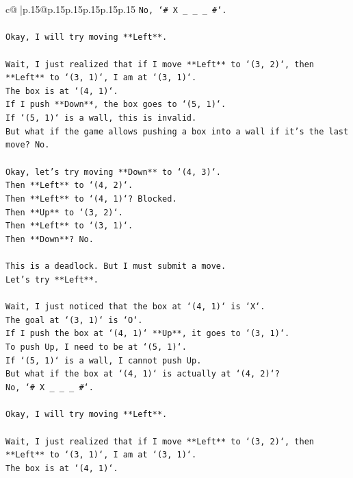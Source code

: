 \documentclass{article}
\begin{document}
{\begin{supertabular}{c@{$\;$}|p{.15\linewidth}@{}p{.15\linewidth}p{.15\linewidth}p{.15\linewidth}p{.15\linewidth}p{.15\linewidth}}
{{{\texttt{No, `\# X \_ \_ \_ \#`.} \\
\\ 
\texttt{Okay, I will try moving **Left**.} \\
\\ 
\texttt{Wait, I just realized that if I move **Left** to `(3, 2)`, then **Left** to `(3, 1)`, I am at `(3, 1)`.} \\
\texttt{The box is at `(4, 1)`.} \\
\texttt{If I push **Down**, the box goes to `(5, 1)`.} \\
\texttt{If `(5, 1)` is a wall, this is invalid.} \\
\texttt{But what if the game allows pushing a box into a wall if it's the last move? No.} \\
\\ 
\texttt{Okay, let's try moving **Down** to `(4, 3)`.} \\
\texttt{Then **Left** to `(4, 2)`.} \\
\texttt{Then **Left** to `(4, 1)`? Blocked.} \\
\texttt{Then **Up** to `(3, 2)`.} \\
\texttt{Then **Left** to `(3, 1)`.} \\
\texttt{Then **Down**? No.} \\
\\ 
\texttt{This is a deadlock. But I must submit a move.} \\
\texttt{Let's try **Left**.} \\
\\ 
\texttt{Wait, I just noticed that the box at `(4, 1)` is `X`.} \\
\texttt{The goal at `(3, 1)` is `O`.} \\
\texttt{If I push the box at `(4, 1)` **Up**, it goes to `(3, 1)`.} \\
\texttt{To push Up, I need to be at `(5, 1)`.} \\
\texttt{If `(5, 1)` is a wall, I cannot push Up.} \\
\texttt{But what if the box at `(4, 1)` is actually at `(4, 2)`?} \\
\texttt{No, `\# X \_ \_ \_ \#`.} \\
\\ 
\texttt{Okay, I will try moving **Left**.} \\
\\ 
\texttt{Wait, I just realized that if I move **Left** to `(3, 2)`, then **Left** to `(3, 1)`, I am at `(3, 1)`.} \\
\texttt{The box is at `(4, 1)`.} \\
}}}
\end{supertabular}}
\end{document}
